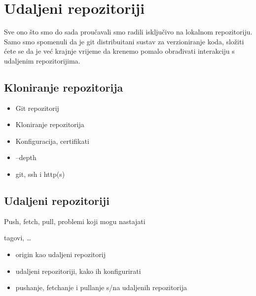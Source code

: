 \chapter*{Udaljeni repozitoriji}

Sve ono što smo do sada proučavali smo radili isključivo na lokalnom repozitoriju.
Samo smo spomenuli da je git distribuitani sustav za verzioniranje koda, složiti ćete se da je već krajnje vrijeme da krenemo pomalo obrađivati interakciju s udaljenim repozitorijima.

\section*{Kloniranje repozitorija}

\begin{itemize}
   \item Git repozitorij
   \item Kloniranje repozitorija
   \item Konfiguracija, certifikati
   \item --depth
   \item git, ssh i http(s)
\end{itemize}

\section*{Udaljeni repozitoriji}

Push, fetch, pull, problemi koji mogu nastajati

tagovi, \dots

\begin{itemize}
   \item origin kao udaljeni repozitorij
   \item udaljeni repozitoriji, kako ih konfigurirati
   \item pushanje, fetchanje i pullanje s/na udaljenih repozitorija
\end{itemize}


